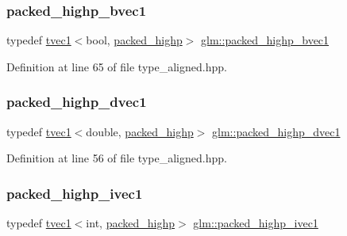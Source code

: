 \subsubsection{\texorpdfstring{packed\_highp\_bvec1}{packed\_highp\_bvec1}}
{\footnotesize\ttfamily typedef \mbox{\hyperlink{structglm_1_1tvec1}{tvec1}}$<$bool, \mbox{\hyperlink{namespaceglm_a0f04f086094c747d227af4425893f545a8e8791ee77fe079b1291f710d88031bf}{packed\+\_\+highp}}$>$ \mbox{\hyperlink{group__gtc__type__aligned_ga377e3268d132071ff041d9a1c960b2db}{glm\+::packed\+\_\+highp\+\_\+bvec1}}}



Definition at line 65 of file type\+\_\+aligned.\+hpp.

\mbox{\label{group__gtc__type__aligned_ga7aa42808654e047d026b0c066870a578}} 
\subsubsection{\texorpdfstring{packed\_highp\_dvec1}{packed\_highp\_dvec1}}
{\footnotesize\ttfamily typedef \mbox{\hyperlink{structglm_1_1tvec1}{tvec1}}$<$double, \mbox{\hyperlink{namespaceglm_a0f04f086094c747d227af4425893f545a8e8791ee77fe079b1291f710d88031bf}{packed\+\_\+highp}}$>$ \mbox{\hyperlink{group__gtc__type__aligned_ga7aa42808654e047d026b0c066870a578}{glm\+::packed\+\_\+highp\+\_\+dvec1}}}



Definition at line 56 of file type\+\_\+aligned.\+hpp.

\mbox{\label{group__gtc__type__aligned_gaec852395d791b6ecacee46c7308db6e9}} 
\subsubsection{\texorpdfstring{packed\_highp\_ivec1}{packed\_highp\_ivec1}}
{\footnotesize\ttfamily typedef \mbox{\hyperlink{structglm_1_1tvec1}{tvec1}}$<$int, \mbox{\hyperlink{namespaceglm_a0f04f086094c747d227af4425893f545a8e8791ee77fe079b1291f710d88031bf}{packed\+\_\+highp}}$>$ \mbox{\hyperlink{group__gtc__type__aligned_gaec852395d791b6ecacee46c7308db6e9}{glm\+::packed\+\_\+highp\+\_\+ivec1}}}



